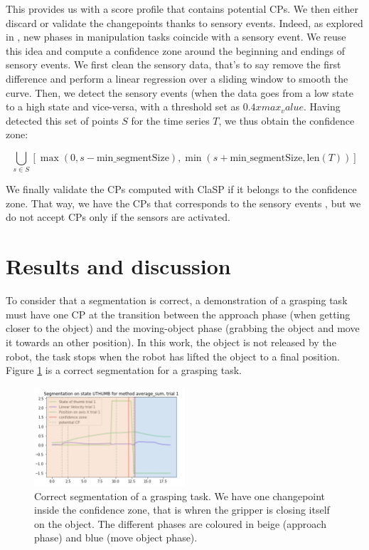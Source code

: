 \documentclass[conference]{IEEEtran}
\begin{document}
This provides us with a score profile that contains potential CPs. We then either discard or validate the changepoints thanks to sensory events. Indeed, as explored in \cite{sensory_seg}, new phases in manipulation tasks coincide  with a sensory event. We reuse this idea and compute a confidence zone around the beginning and endings of sensory events. We first clean the sensory data, that's to say remove the first difference and perform a linear regression over a sliding window to smooth the curve. Then,  we detect the sensory events  (when the data goes from a low state to a high  state and vice-versa, with a threshold set as $0.4 x max_value$. Having detected this set of points $S$ for the time series $T$, we thus obtain the confidence zone:

\begin{equation}
        \bigcup_{s \in S} \left[ \max(0, s - \text{min\_segmentSize}),\min(s + \text{min\_segmentSize}, \text{len}(T)) \right]
\end{equation}

We finally validate the CPs computed with ClaSP if it belongs to the confidence zone. That way, we have the CPs that corresponds to the sensory events , but we do not accept CPs only if the sensors are activated.

\section{Results and discussion} \label{results}

To consider that a segmentation is correct, a demonstration of a grasping task must have one CP at the transition between the approach phase (when getting closer to the object) and the moving-object phase (grabbing the object and move it towards an other position). In this work, the object is not released by the robot, the task stops when the robot has lifted the object to a final position. Figure \ref{fig:coloredseg} is a correct segmentation for a grasping task.

\begin{figure}[ht]
  \centering
  \includegraphics[width=0.5\textwidth]{img/colored_segmentation.png}
  \caption{Correct segmentation of a grasping task. We have one changepoint inside the confidence zone, that is whren the gripper is closing itself on the object. The different phases are coloured in beige (approach phase) and blue (move object phase).}
  \label{fig:coloredseg}
\end{figure}
\end{document}
